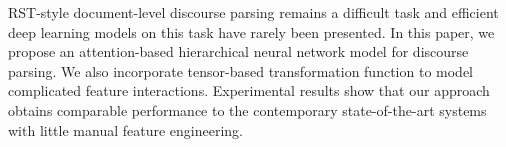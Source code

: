 RST-style document-level discourse parsing remains a difficult task and efficient deep learning models on this task have rarely been presented. In this paper, we propose an attention-based hierarchical  neural network model for discourse parsing. We also incorporate tensor-based transformation function to model complicated feature interactions. Experimental results show that our approach obtains comparable performance to the contemporary state-of-the-art systems with little manual feature engineering.
